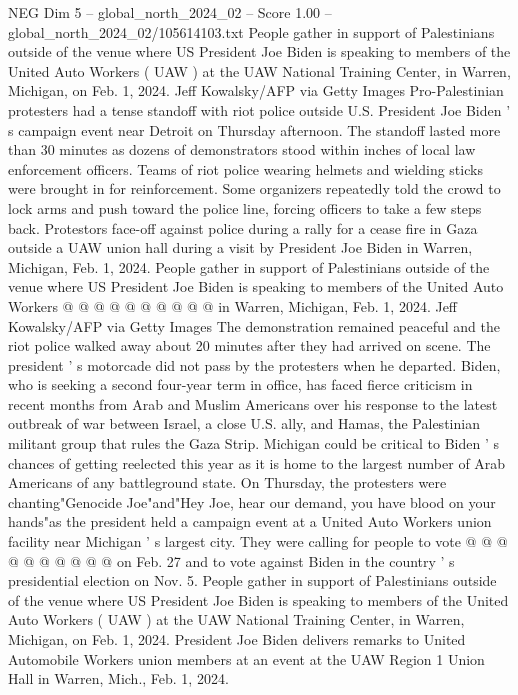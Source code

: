 \begin{textsample}{NEG Dim 5 – global\_north\_2024\_02 – Score 1.00 – global\_north\_2024\_02/105614103.txt}  \label{ex:f5_neg_216}
People gather in support of Palestinians outside of the venue where US President Joe Biden is speaking to members of the United Auto Workers ( UAW ) at the UAW National Training Center, in Warren, Michigan, on Feb. 1, 2024.
Jeff Kowalsky/AFP via Getty Images Pro-Palestinian protesters had a tense standoff with riot police outside U.S.
President Joe Biden ' s campaign event near Detroit on Thursday afternoon.
The standoff lasted more than 30 minutes as dozens of demonstrators stood within inches of local law enforcement officers.
Teams of riot police wearing helmets and wielding sticks were brought in for reinforcement.
Some organizers repeatedly told the crowd to lock arms and push toward the police line, forcing officers to take a few steps back.
Protestors face-off against police during a rally for a cease fire in Gaza outside a UAW union hall during a visit by President Joe Biden in Warren, Michigan, Feb. 1, 2024.
People gather in support of Palestinians outside of the venue where US President Joe Biden is speaking to members of the United Auto Workers @ @ @ @ @ @ @ @ @ @ in Warren, Michigan, Feb. 1, 2024.
Jeff Kowalsky/AFP via Getty Images The demonstration remained peaceful and the riot police walked away about 20 minutes after they had arrived on scene.
The president ' s motorcade did not pass by the protesters when he departed.
Biden, who is seeking a second four-year term in office, has faced fierce criticism in recent months from Arab and Muslim Americans over his response to the latest outbreak of war between Israel, a close U.S. ally, and Hamas, the Palestinian militant group that rules the Gaza Strip.
Michigan could be critical to Biden ' s chances of getting reelected this year as it is home to the largest number of Arab Americans of any battleground state.
On Thursday, the protesters were chanting"Genocide Joe"and"Hey Joe, hear our demand, you have blood on your hands"as the president held a campaign event at a United Auto Workers union facility near Michigan ' s largest city.
They were calling for people to vote @ @ @ @ @ @ @ @ @ @ on Feb. 27 and to vote against Biden in the country ' s presidential election on Nov. 5.
People gather in support of Palestinians outside of the venue where US President Joe Biden is speaking to members of the United Auto Workers ( UAW ) at the UAW National Training Center, in Warren, Michigan, on Feb. 1, 2024.
President Joe Biden delivers remarks to United Automobile Workers union members at an event at the UAW Region 1 Union Hall in Warren, Mich., Feb. 1, 2024.

\end{textsample}
